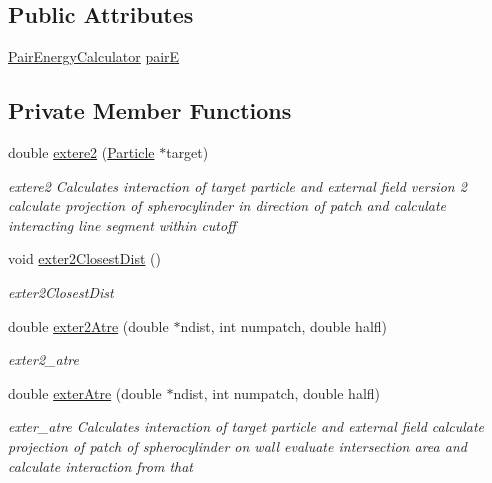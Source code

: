 \subsection*{Public Attributes}
\begin{DoxyCompactItemize}
\item 
\hyperlink{class_pair_energy_calculator}{Pair\+Energy\+Calculator} \hyperlink{class_total_energy_calculator_a42d9a9a956351ee23ba23fb7dd30d4d0}{pair\+E}
\end{DoxyCompactItemize}
\subsection*{Private Member Functions}
\begin{DoxyCompactItemize}
\item 
double \hyperlink{class_total_energy_calculator_a89a6dcc55f2f0528c12f8802508fbf5b}{extere2} (\hyperlink{class_particle}{Particle} $\ast$target)
\begin{DoxyCompactList}\small\item\em extere2 Calculates interaction of target particle and external field version 2 calculate projection of spherocylinder in direction of patch and calculate interacting line segment within cutoff \end{DoxyCompactList}\item 
void \hyperlink{class_total_energy_calculator_aa0e675faa678a69f36486561b50765d4}{exter2\+Closest\+Dist} ()
\begin{DoxyCompactList}\small\item\em exter2\+Closest\+Dist \end{DoxyCompactList}\item 
double \hyperlink{class_total_energy_calculator_ae6894b0058a8dc9137935d5aa4cad517}{exter2\+Atre} (double $\ast$ndist, int numpatch, double halfl)
\begin{DoxyCompactList}\small\item\em exter2\+\_\+atre \end{DoxyCompactList}\item 
double \hyperlink{class_total_energy_calculator_a5b1555512d0d6891a77bf7d036df5d35}{exter\+Atre} (double $\ast$ndist, int numpatch, double halfl)
\begin{DoxyCompactList}\small\item\em exter\+\_\+atre Calculates interaction of target particle and external field calculate projection of patch of spherocylinder on wall evaluate intersection area and calculate interaction from that \end{DoxyCompactList}\item 

\end{DoxyCompactItemize}
